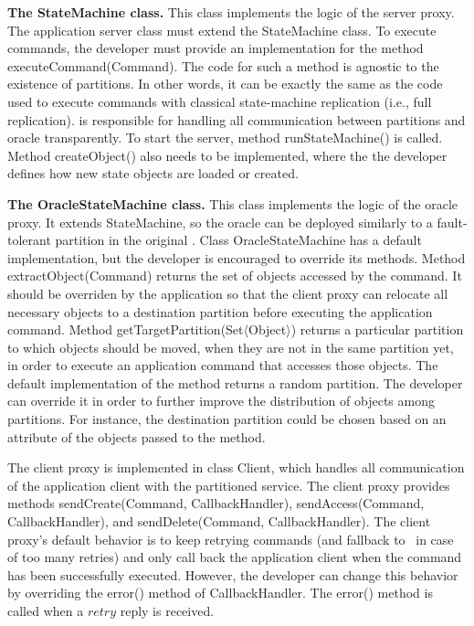 
\textbf{The StateMachine class.} This class implements the logic of the server proxy. The application server class must extend the StateMachine class. To execute commands, the developer must provide an implementation for the method executeCommand(Command). The code for such a method is agnostic to the existence of partitions. In other words, it can be exactly the same as the code used to execute commands with classical state-machine replication (i.e., full replication). \libname{} is responsible for handling all communication between partitions and oracle transparently. To start the server, method runStateMachine() is called. Method createObject() also needs to be implemented, where the the developer defines how new state objects are loaded or created.

\textbf{The OracleStateMachine class.} This class implements the logic of the oracle proxy. It extends StateMachine, so the oracle can be deployed similarly to a fault-tolerant partition in the original \ssmr{}. Class OracleStateMachine has a default implementation, but the developer is encouraged to override its methods. Method extractObject(Command) returns the set of objects accessed by the command. It should be overriden by the application so that the client proxy can relocate all necessary objects to a destination partition before executing the application command.
Method getTargetPartition(Set$\langle$Object$\rangle$) returns a particular partition to which objects should be moved, when they are not in the same partition yet, in order to execute an application command that accesses those objects. The default implementation of the method returns a random partition. The developer can override it in order to further improve the distribution of objects among partitions.
For instance, the destination partition could be chosen based on an attribute of the objects passed to the method.

The client proxy is implemented in class Client, which handles all communication of the application client with the partitioned service. The client proxy provides methods sendCreate(Command, CallbackHandler), sendAccess(Command, CallbackHandler), and sendDelete(Command, CallbackHandler). The client proxy's default behavior is to keep retrying commands (and fallback to \dssmr\ in case of too many retries) and only call back the application client when the command has been successfully executed.
However, the developer can change this behavior by overriding the error() method of CallbackHandler. The error() method is called when a $retry$ reply is received.

